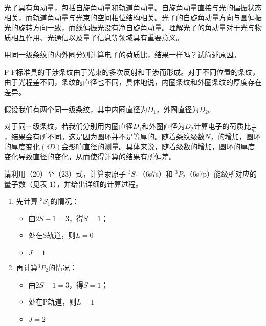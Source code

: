 \documentclass[dvipsnames, svgnames,a4paper,11pt]{article}
\begin{document}
	光子具有角动量，包括自旋角动量和轨道角动量。自旋角动量直接与光的偏振状态相关，而轨道角动量与光束的空间相位结构相关。光子的自旋角动量方向与圆偏振光的旋转方向一致，而线偏振光没有净自旋角动量。理解光子的角动量对于光与物质相互作用、光通信以及量子信息等领域具有重要意义。





\begin{question}
	用同一级条纹的内外圈分别计算电子的荷质比，结果一样吗？试简述原因。
\end{question}


	F-P标准具的干涉条纹由于光束的多次反射和干涉而形成。对于不同位置的条纹，由于光程差不同，条纹的直径也不同，具体地说，内圈条纹和外圈条纹的厚度存在差异。

	假设我们有两个同一级条纹，其中内圈直径为$D_1$，外圈直径为$D_2$。

	对于同一级条纹，若我们分别用内圈直径$D_1$和外圈直径为$D_2$计算电子的荷质比$\frac{e}{m}$，结果会有所不同。这是因为圆环并不是等厚的。随着条纹级数$N$，的增加，圆环的厚度变化$(\delta D)$会影响直径的测量。具体来说，随着级数的增加，圆环的厚度变化导致直径的变化，从而使得计算的结果有所偏差。




\begin{question}
	请利用（20）至（23）式，计算汞原子 $^3S_1$（6s7s）和 $^3P_2$（6s7p）能级所对应的量子数（见表 1），并给出详细的计算过程。
\end{question}

	\begin{enumerate}
		\item 先计算 $^3S_1$的情况：
		
			\begin{itemize}
				\item 由$2S + 1 = 3$，得$S = 1$；
				\item 处在S轨道，则$L = 0$
				\item $J = 1$
			\end{itemize}

		\item 再计算$^3P_2$的情况：
			
			\begin{itemize}
				\item 由$2S + 1 = 3$，得$S = 1$；
				\item 处在P轨道，则$L = 1$
				\item $J = 2$
			\end{itemize}
	\end{enumerate}
\end{document}
